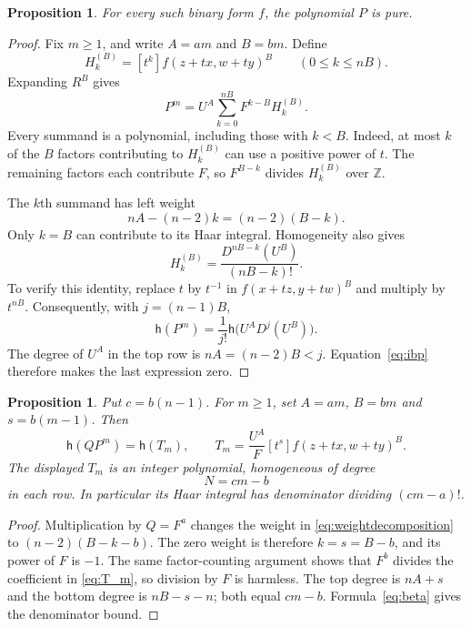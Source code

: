 \documentclass[11pt]{article}
\numberwithin{equation}{section}
\newtheorem{proposition}[theorem]{Proposition}
\theoremstyle{definition}
\theoremstyle{remark}
\newcommand{\Z}{\mathbb Z}
\newcommand{\h}{\mathsf h}
\begin{document}
\begin{proposition}\label{prop:pure}
For every such binary form $f$, the polynomial $P$ is pure.
\end{proposition}
\begin{proof}
Fix $m\geq1$, and write $A=am$ and $B=bm$. Define
\[
 H_k^{(B)}=[t^k]f(z+tx,w+ty)^B\qquad(0\leq k\leq nB).
\]
Expanding $R^B$ gives
\begin{equation}\label{eq:weightdecomposition}
 P^m=U^A\sum_{k=0}^{nB}F^{k-B}H_k^{(B)}.
\end{equation}
Every summand is a polynomial, including those with $k<B$.
Indeed, at most $k$ of the $B$ factors contributing to $H_k^{(B)}$ can
use a positive power of $t$. The remaining factors each contribute $F$,
so $F^{B-k}$ divides $H_k^{(B)}$ over $\Z$.

The $k$th summand has left weight
\[
 nA-(n-2)k=(n-2)(B-k).
\]
Only $k=B$ can contribute to its Haar integral. Homogeneity also gives
\begin{equation}\label{eq:reversecoefficient}
 H_k^{(B)}=\frac{D^{nB-k}(U^B)}{(nB-k)!}.
\end{equation}
To verify this identity, replace $t$ by $t^{-1}$ in
$f(x+tz,y+tw)^B$ and multiply by $t^{nB}$.
Consequently, with $j=(n-1)B$,
\[
 \h(P^m)=\frac1{j!}\h\bigl(U^AD^j(U^B)\bigr).
\]
The degree of $U^A$ in the top row is $nA=(n-2)B<j$.
Equation~\eqref{eq:ibp} therefore makes the last expression zero.
\end{proof}

\begin{proposition}\label{prop:markedcomponent}
Put $c=b(n-1)$. For $m\geq1$, set $A=am$, $B=bm$ and $s=b(m-1)$.
Then
\begin{equation}\label{eq:T_m}
 \h(QP^m)=\h(T_m),\qquad
 T_m=\frac{U^A}{F}[t^s]f(z+tx,w+ty)^B.
\end{equation}
The displayed $T_m$ is an integer polynomial, homogeneous of degree
\begin{equation}\label{eq:rowdegree}
 N=cm-b
\end{equation}
in each row. In particular its Haar integral has denominator dividing
$(cm-a)!$.
\end{proposition}
\begin{proof}
Multiplication by $Q=F^a$ changes the weight in
\eqref{eq:weightdecomposition} to $(n-2)(B-k-b)$.
The zero weight is therefore $k=s=B-b$, and its power of $F$ is $-1$.
The same factor-counting argument shows that $F^b$ divides the coefficient
in \eqref{eq:T_m}, so division by $F$ is harmless.
The top degree is $nA+s$ and the bottom degree is $nB-s-n$;
both equal $cm-b$. Formula~\eqref{eq:beta} gives the denominator bound.
\end{proof}
\end{document}
